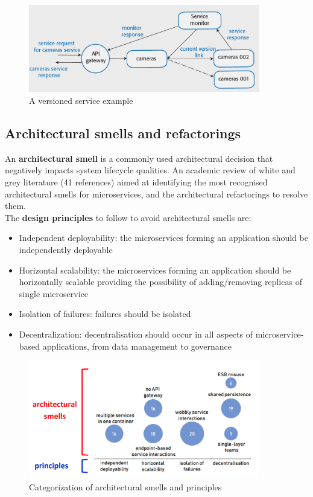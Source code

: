 \documentclass[10pt,a4paper]{report}
\begin{document}
\begin{figure}[h]
	\centering
	\includegraphics[width=0.9\textwidth]{image68}
	\caption{A versioned service example}
	\label{image68}
\end{figure} 


\subsection{Architectural smells and refactorings}
An \textbf{architectural smell} is a commonly used architectural decision that negatively impacts system lifecycle qualities. An academic review of white and grey literature (41 references) aimed at identifying the most recognised architectural smells for microservices, and the architectural refactorings to resolve them.\\
The \textbf{design principles} to follow to avoid architectural smells are:
\begin{itemize}
	\item Independent deployability: the microservices forming an application should be independently deployable
	\item Horizontal scalability: the microservices forming an application should be horizontally scalable providing the possibility of adding/removing replicas of single microservice
	\item Isolation of failures: failures should be isolated
	\item Decentralization: decentralisation should occur in all aspects of microservice-based applications,
	from data management to governance
\end{itemize}
\begin{figure}[h]
	\centering
	\includegraphics[width=0.9\textwidth]{image69}
	\caption{Categorization of architectural smells and principles}
	\label{image69}
\end{figure} 
\end{document}
